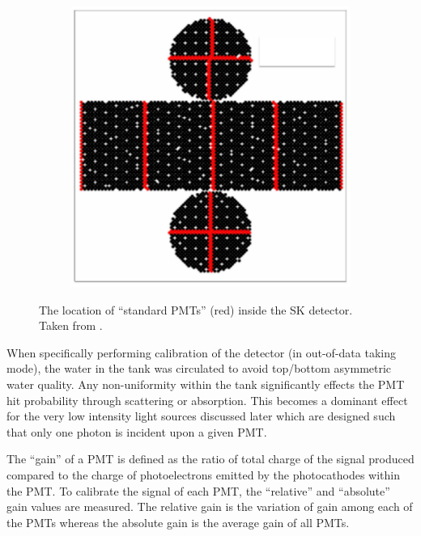 \begin{figure}[h]
  \begin{subfigure}[t]{0.50\textwidth}
    \includegraphics[width=\textwidth, trim={0mm 0mm 0mm 0mm}, clip,page=1]{Figures/Detectors/StandardPMTs.pdf}
  \end{subfigure}
  \caption{The location of ``standard PMTs'' (red) inside the SK detector. Taken from \cite{Abe_2014_SKCalib}.}
  \label{fig:T2KSKExp_SK_StandardPMTs}
\end{figure}

When specifically performing calibration of the detector (in out-of-data taking mode), the water in the tank was circulated to avoid top/bottom asymmetric water quality. Any non-uniformity within the tank significantly effects the PMT hit probability through scattering or absorption. This becomes a dominant effect for the very low intensity light sources discussed later which are designed such that only one photon is incident upon a given PMT.

The ``gain'' of a PMT is defined as the ratio of total charge of the signal produced compared to the charge of photoelectrons emitted by the photocathodes within the PMT. To calibrate the signal of each PMT, the ``relative'' and ``absolute'' gain values are measured. The relative gain is the variation of gain among each of the PMTs whereas the absolute gain is the average gain of all PMTs. 

